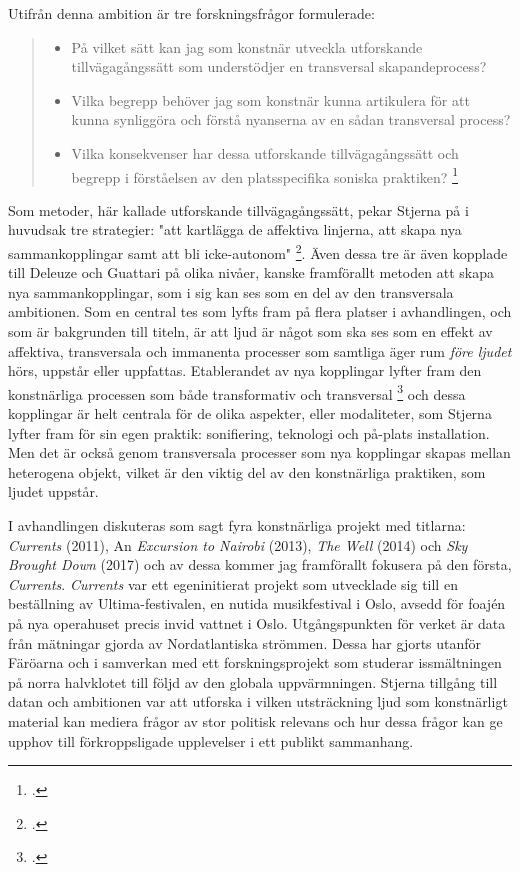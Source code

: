 \documentclass[11pt]{article}
\begin{document}
Utifrån denna ambition är tre forskningsfrågor formulerade:
\begin{quote}
    \begin{itemize}
      \item På vilket sätt kan jag som konstnär utveckla utforskande
        tillvägagångssätt som understödjer en transversal
        skapandeprocess?
      \item Vilka begrepp behöver jag som konstnär kunna artikulera
        för att kunna synliggöra och förstå nyanserna av en sådan
        transversal process?
      \item Vilka konsekvenser har dessa utforskande tillvägagångssätt
        och begrepp i förståelsen av den platsspecifika soniska
        praktiken? \footcite[sid. 294 (sid. 27)]{Stjerna2018}
    \end{itemize}
\end{quote}

Som metoder, här kallade utforskande tillvägagångssätt, pekar Stjerna
på i huvudsak tre strategier: "att kartlägga de affektiva linjerna,
att skapa nya sammankopplingar samt att bli icke-autonom"
\footcite[sid. 294]{Stjerna2018}. Även dessa tre är även kopplade till
Deleuze och Guattari på olika nivåer, kanske framförallt metoden att
skapa nya sammankopplingar, som i sig kan ses som en del av den
transversala ambitionen. Som en central tes som lyfts fram på flera
platser i avhandlingen, och som är bakgrunden till titeln, är att ljud
är något som ska ses som en effekt av affektiva, transversala och
immanenta processer som samtliga äger rum \emph{före ljudet} hörs,
uppstår eller uppfattas. Etablerandet av nya kopplingar lyfter fram
den konstnärliga processen som både transformativ och transversal
\footcite[sid. 119]{Stjerna2018} och dessa kopplingar är helt centrala
för de olika aspekter, eller modaliteter, som Stjerna lyfter fram för
sin egen praktik: sonifiering, teknologi och på-plats
installation. Men det är också genom transversala processer som nya
kopplingar skapas mellan heterogena objekt, vilket är den viktig del
av den konstnärliga praktiken, som ljudet uppstår.

I avhandlingen diskuteras som sagt fyra konstnärliga projekt med
titlarna: \emph{Currents} (2011), An \emph{Excursion to Nairobi}
(2013), \emph{The Well} (2014) och \emph{Sky Brought Down} (2017) och
av dessa kommer jag framförallt fokusera på den första,
\emph{Currents}. \emph{Currents} var ett egeninitierat projekt som
utvecklade sig till en beställning av Ultima-festivalen, en nutida
musikfestival i Oslo, avsedd för foajén på nya operahuset precis invid
vattnet i Oslo. Utgångspunkten för verket är data från mätningar
gjorda av Nordatlantiska strömmen. Dessa har gjorts utanför Färöarna
och i samverkan med ett forskningsprojekt som studerar issmältningen
på norra halvklotet till följd av den globala uppvärmningen. 
Stjerna tillgång till datan och ambitionen var att utforska i vilken
utsträckning ljud som konstnärligt material kan mediera frågor av stor
politisk relevans och hur dessa frågor kan ge upphov till
förkroppsligade upplevelser i ett publikt sammanhang.
\end{document}
